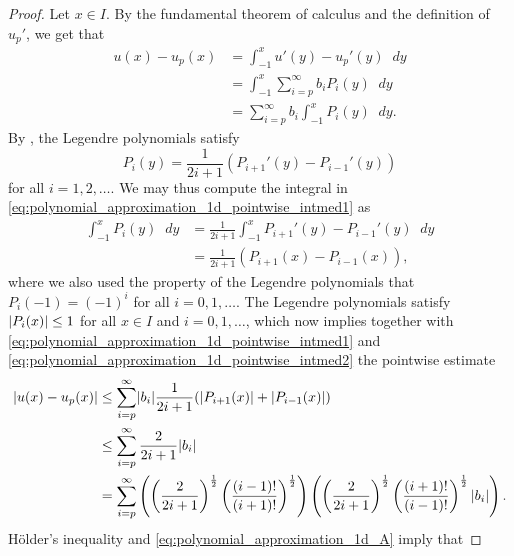 \documentclass[english, 12pt, a4paper, sci, utf8, a-2b, online]{aaltothesis}
\theoremstyle{definition}
\theoremstyle{plain}
\DeclarePairedDelimiter\abs{\lvert}{\rvert}
\newcommand*\diff{\mathop{}\!d}
\numberwithin{equation}{section}
\begin{document}
\begin{proof}
    Let $x \in I$. By the fundamental theorem of calculus
    and the definition of $u_p'$, we get that
    \begin{align}
        u(x) - u_p(x)
        &= \int_{-1}^{x} u'(y) - u_p'(y) \diff y \nonumber \\
        &= \int_{-1}^{x} \sum_{i=p}^{\infty} b_i P_i(y) \diff y \nonumber \\
        \label{eq:polynomial_approximation_1d_pointwise_intmed1}
        &= \sum_{i=p}^{\infty} b_i \int_{-1}^{x} P_i(y) \diff y.
    \end{align}
    By \cite[p.~151]{andrews1998}, the Legendre polynomials satisfy
    \begin{equation*}
        P_i(y) = \frac{1}{2i+1} (P_{i+1}'(y) - P_{i-1}'(y))
    \end{equation*}
    for all $i=1,2,\dotsc$. We may thus compute the integral in
    \eqref{eq:polynomial_approximation_1d_pointwise_intmed1} as
    \begin{align}
        \int_{-1}^{x} P_i(y) \diff y
        &= \frac{1}{2i+1} \int_{-1}^{x} P_{i+1}'(y) - P_{i-1}'(y) \diff y \nonumber \\
        \label{eq:polynomial_approximation_1d_pointwise_intmed2}
        &= \frac{1}{2i+1} (P_{i+1}(x) - P_{i-1}(x)),
    \end{align}
    where we also used the property of the Legendre polynomials that
    $P_i(-1) = (-1)^i$ for all $i=0,1,\dotsc$.
    The Legendre polynomials satisfy $\abs{P_i(x)} \leq 1$ for all $x \in I$
    and $i=0,1,\dotsc$, which now implies together with
    \eqref{eq:polynomial_approximation_1d_pointwise_intmed1}
    and \eqref{eq:polynomial_approximation_1d_pointwise_intmed2}
    the pointwise estimate
    \begin{align*}
        \abs{u(x) - u_p(x)}
        &\leq \sum_{i=p}^{\infty} \abs{b_i} \frac{1}{2i+1}
            (\abs{P_{i+1}(x)} + \abs{P_{i-1}(x)}) \\
        &\leq \sum_{i=p}^{\infty} \frac{2}{2i+1} \abs{b_i} \\
        &= \sum_{i=p}^{\infty}
            \left(
                \left( \frac{2}{2i+1} \right)^{\frac{1}{2}}
                \left( \frac{(i-1)!}{(i+1)!} \right)^{\frac{1}{2}}
            \right)
            \left(
                \left( \frac{2}{2i+1} \right)^{\frac{1}{2}}
                \left( \frac{(i+1)!}{(i-1)!} \right)^{\frac{1}{2}}
                \abs{b_i}
            \right).
    \end{align*}
    Hölder's inequality and \eqref{eq:polynomial_approximation_1d_A} imply that

\end{proof}
\end{document}
